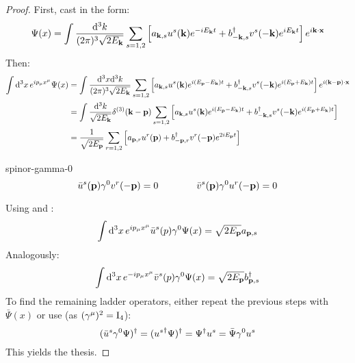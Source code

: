 \begin{proofbox}
  \begin{proof}
    First, cast  in the form:
    \begin{equation*}
      \Psi(x) = \int \frac{\mathrm{d}^3k}{(2\pi)^3 \sqrt{2E_{\mathbf{k}}}} \sum_{s = 1,2} \left[ a_{\mathbf{k},s} u^s(\mathbf{k}) e^{-i E_{\mathbf{k}} t} + b_{-\mathbf{k},s}^\dagger v^s(-\mathbf{k}) e^{i E_{\mathbf{k}} t} \right] e^{i \mathbf{k} \cdot \mathbf{x}}
    \end{equation*}
    Then:
    \begin{equation*}
      \begin{split}
        \int \mathrm{d}^3x\, e^{i p_\mu x^\mu} \Psi(x)
        & = \int \frac{\mathrm{d}^3x \mathrm{d}^3k}{(2\pi)^3 \sqrt{2E_{\mathbf{k}}}} \sum_{s = 1,2} \left[ a_{\mathbf{k},s} u^s(\mathbf{k}) e^{i (E_{\mathbf{p}} - E_{\mathbf{k}}) t} + b_{-\mathbf{k},s}^\dagger v^s(-\mathbf{k}) e^{i (E_{\mathbf{p}} + E_{\mathbf{k}}) t} \right] e^{i (\mathbf{k} - \mathbf{p}) \cdot \mathbf{x}} \\
        & = \int \frac{\mathrm{d}^3k}{\sqrt{2E_{\mathbf{k}}}} \delta^{(3)}(\mathbf{k} - \mathbf{p}) \sum_{s = 1,2} \left[ a_{\mathbf{k},s} u^s(\mathbf{k}) e^{i (E_{\mathbf{p}} - E_{\mathbf{k}}) t} + b_{-\mathbf{k},s}^\dagger v^s(-\mathbf{k}) e^{i (E_{\mathbf{p}} + E_{\mathbf{k}}) t} \right] \\
        & = \frac{1}{\sqrt{2E_{\mathbf{p}}}} \sum_{r = 1,2} \left[ a_{\mathbf{p},r} u^r(\mathbf{p}) + b_{-\mathbf{p},r}^\dagger v^r(-\mathbf{p}) e^{2i E_{\mathbf{p}} t} \right]
      \end{split}
    \end{equation*}

    \begin{lemma}[before upper = {\tcbtitle}, borderline = {1pt}{0pt}{blue!35!black}]{}{spinor-gamma-0}
      \begin{equation}
        \bar{u}^s(\mathbf{p}) \gamma^0 v^r(-\mathbf{p}) = 0
        \qquad \qquad
        \bar{v}^s(\mathbf{p}) \gamma^0 u^r(-\mathbf{p}) = 0
      \end{equation}
    \end{lemma}

    Using  and :
    \begin{equation*}
      \int \mathrm{d}^3x\, e^{i p_\mu x^\mu} \bar{u}^s(p) \gamma^0 \Psi(x) = \sqrt{2E_{\mathbf{p}}} a_{\mathbf{p},s}
    \end{equation*}
    Analogously:
    \begin{equation*}
      \int \mathrm{d}^3x\, e^{-i p_\mu x^\mu} \bar{v}^s(p) \gamma^0 \Psi(x) = \sqrt{2E_{\mathbf{p}}} b_{\mathbf{p},s}^\dagger
    \end{equation*}
    To find the remaining ladder operators, either repeat the previous steps with $ \bar{\Psi}(x) $ or use (as $ (\gamma^\mu)^2 = \mathrm{I}_4 $):
    \begin{equation}
      (\bar{u}^s \gamma^0 \Psi)^\dagger = ({u^s}^\dagger \Psi)^\dagger = \Psi^\dagger u^s = \bar{\Psi} \gamma^0 u^s
    \end{equation}
    This yields the thesis.
  \end{proof}
\end{proofbox}

